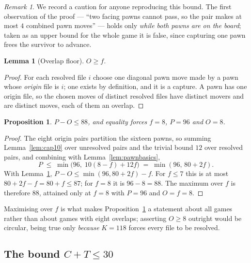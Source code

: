 \documentclass[11pt]{article}
\newtheorem{lemma}[theorem]{Lemma}
\newtheorem{proposition}[theorem]{Proposition}
\theoremstyle{definition}
\theoremstyle{remark}
\newtheorem{remark}[theorem]{Remark}
\theoremstyle{plain}
\begin{document}
\begin{remark}\label{rem:cap10caution}
We record a caution for anyone reproducing this bound. The first
observation of the proof --- ``two facing pawns cannot pass, so the pair
makes at most $4$ combined pawn moves'' --- holds only \emph{while both
pawns are on the board}; taken as an upper bound for the whole game it is
false, since capturing one pawn frees the survivor to advance.
\end{remark}

\begin{lemma}[Overlap floor]\label{lem:overlapfloor}
$O \ge f$.
\end{lemma}

\begin{proof}
For each resolved file $i$ choose one diagonal pawn move made by a pawn
whose \emph{origin} file is $i$; one exists by definition, and it is a
capture. A pawn has one origin file, so the chosen moves of distinct
resolved files have distinct movers and are distinct moves, each of them
an overlap.
\end{proof}

\begin{proposition}\label{prop:pminuso}
$P - O \le 88$, and equality forces $f = 8$, $P = 96$ and $O = 8$.
\end{proposition}

\begin{proof}
The eight origin pairs partition the sixteen pawns, so summing
Lemma~\ref{lem:cap10} over unresolved pairs and the trivial bound $12$ over
resolved pairs, and combining with Lemma~\ref{lem:pawnbasics},
\[
  P \;\le\; \min\bigl(96,\; 10(8-f) + 12f\bigr) \;=\; \min(96,\, 80 + 2f).
\]
With Lemma~\ref{lem:overlapfloor},
$P - O \le \min(96, 80+2f) - f$. For $f \le 7$ this is at most
$80 + 2f - f = 80 + f \le 87$; for $f = 8$ it is $96 - 8 = 88$. The maximum
over $f$ is therefore $88$, attained only at $f = 8$ with $P = 96$ and
$O = f = 8$.
\end{proof}

Maximising over $f$ is what makes Proposition~\ref{prop:pminuso} a statement
about all games rather than about games with eight overlaps; asserting
$O \ge 8$ outright would be circular, being true only \emph{because}
$K = 118$ forces every file to be resolved.

\subsection{The bound \texorpdfstring{$C + T \le 30$}{C + T <= 30}}
\end{document}
